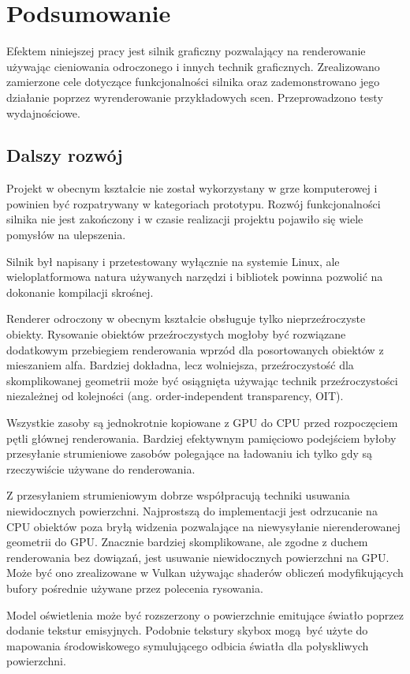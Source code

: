 \chapter{Podsumowanie}
\label{chap:summary}

Efektem niniejszej pracy jest silnik graficzny pozwalający na renderowanie używając cieniowania odroczonego i innych technik graficznych.
Zrealizowano zamierzone cele dotyczące funkcjonalności silnika oraz zademonstrowano jego działanie poprzez wyrenderowanie przykładowych scen. Przeprowadzono testy wydajnościowe.

\section{Dalszy rozwój}

Projekt w obecnym kształcie nie został wykorzystany w grze komputerowej i powinien być rozpatrywany w kategoriach prototypu.
Rozwój funkcjonalności silnika nie jest zakończony i w czasie realizacji projektu pojawiło się wiele pomysłów na ulepszenia.

Silnik był napisany i przetestowany wyłącznie na systemie Linux, ale wieloplatformowa natura używanych narzędzi i bibliotek powinna pozwolić na dokonanie kompilacji skrośnej.

Renderer odroczony w obecnym kształcie obsługuje tylko nieprzeźroczyste obiekty. Rysowanie obiektów przeźroczystych mogłoby być rozwiązane dodatkowym przebiegiem renderowania wprzód dla posortowanych obiektów z mieszaniem alfa. Bardziej dokładna, lecz wolniejsza, przeźroczystość dla skomplikowanej geometrii może być osiągnięta używając technik przeźroczystości niezależnej od kolejności (ang. order-independent transparency, OIT).

Wszystkie zasoby są jednokrotnie kopiowane z GPU do CPU przed rozpoczęciem pętli głównej renderowania.
Bardziej efektywnym pamięciowo podejściem byłoby przesyłanie strumieniowe zasobów polegające na ładowaniu ich tylko gdy są rzeczywiście używane do renderowania.

Z przesyłaniem strumieniowym dobrze współpracują techniki usuwania niewidocznych powierzchni.
Najprostszą do implementacji jest odrzucanie na CPU obiektów poza bryłą widzenia pozwalające na niewysyłanie nierenderowanej geometrii do GPU.
Znacznie bardziej skomplikowane, ale zgodne z duchem renderowania bez dowiązań, jest usuwanie niewidocznych powierzchni na GPU. Może być ono zrealizowane w Vulkan używając shaderów obliczeń modyfikujących bufory pośrednie używane przez polecenia rysowania.

Model oświetlenia może być rozszerzony o powierzchnie emitujące światło poprzez dodanie tekstur emisyjnych.
Podobnie tekstury skybox mogą być użyte do mapowania środowiskowego symulującego odbicia światła dla połyskliwych powierzchni.
